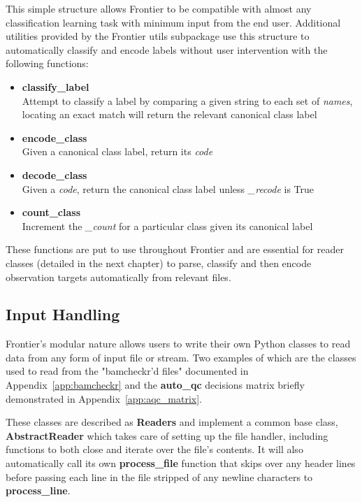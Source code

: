 This simple structure allows Frontier to be compatible with almost any
classification learning task with minimum input from the end user. Additional
utilities provided by the Frontier utils subpackage use this structure to
automatically classify and encode labels without user intervention with the
following functions:

\begin{itemize}
    \item \textbf{classify\_label} \hfill\\
        Attempt to classify a label by comparing a given string to each set of
        \textit{names}, locating an exact match will return the relevant
        canonical class label
    \item \textbf{encode\_class} \hfill\\
        Given a canonical class label, return its \textit{code}
    \item \textbf{decode\_class} \hfill\\
        Given a \textit{code}, return the canonical class label unless
        \textit{\_recode} is True
    \item \textbf{count\_class} \hfill\\
        Increment the \textit{\_count} for a particular class given its
        canonical label
\end{itemize}

These functions are put to use throughout Frontier and are essential for reader
classes (detailed in the next chapter) to parse, classify and then encode
observation targets automatically from relevant files.


\subsection{Input Handling}
\label{sec:frontier-input}

Frontier's modular nature allows users to write their own Python classes to read
data from any form of input file or stream. Two examples of which are the
classes used to read from the "bamcheckr'd files" documented in
Appendix~\ref{app:bamcheckr} and the \textbf{auto\_qc} decisions matrix briefly
demonstrated in Appendix~\ref{app:aqc_matrix}.

These classes are described as \textbf{Readers} and implement a common base
class, \textbf{AbstractReader} which takes care of
setting up the file handler, including functions to both close and iterate over
the file's contents. It will also automatically call its own
\textbf{process\_file} function that skips over any header lines before passing
each line in the file stripped of any newline characters to \textbf{process\_line}.

